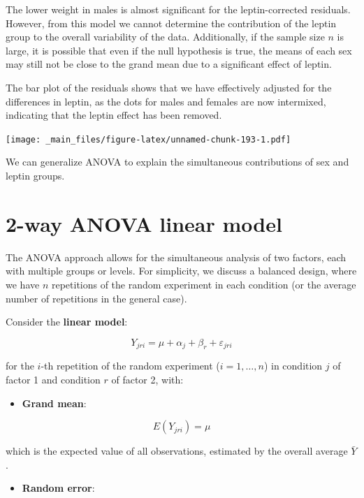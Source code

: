 \documentclass[
]{book}
\providecommand{\tightlist}{%
  \setlength{\itemsep}{0pt}\setlength{\parskip}{0pt}}
\begin{document}
The lower weight in males is almost significant for the leptin-corrected residuals. However, from this model we cannot determine the contribution of the leptin group to the overall variability of the data. Additionally, if the sample size \(n\) is large, it is possible that even if the null hypothesis is true, the means of each sex may still not be close to the grand mean due to a significant effect of leptin.

The bar plot of the residuals shows that we have effectively adjusted for the differences in leptin, as the dots for males and females are now intermixed, indicating that the leptin effect has been removed.

\texttt{[image: \_main\_files/figure-latex/unnamed-chunk-193-1.pdf]}

We can generalize ANOVA to explain the simultaneous contributions of sex and leptin groups.

\hypertarget{way-anova-linear-model}{%
\section{2-way ANOVA linear model}\label{way-anova-linear-model}}

The ANOVA approach allows for the simultaneous analysis of two factors, each with multiple groups or levels. For simplicity, we discuss a balanced design, where we have \(n\) repetitions of the random experiment in each condition (or the average number of repetitions in the general case).

Consider the \textbf{linear model}:

\[
Y_{jri} = \mu + \alpha_j + \beta_r + \varepsilon_{jri}
\]

for the \(i\)-th repetition of the random experiment (\(i = 1, \dots, n\)) in condition \(j\) of factor 1 and condition \(r\) of factor 2, with:

\begin{itemize}
\tightlist
\item
  \textbf{Grand mean}:
\end{itemize}

\[
E(Y_{jri}) = \mu
\]

which is the expected value of all observations, estimated by the overall average \(\bar{Y}\).

\begin{itemize}
\tightlist
\item
  \textbf{Random error}:
\end{itemize}
\end{document}
